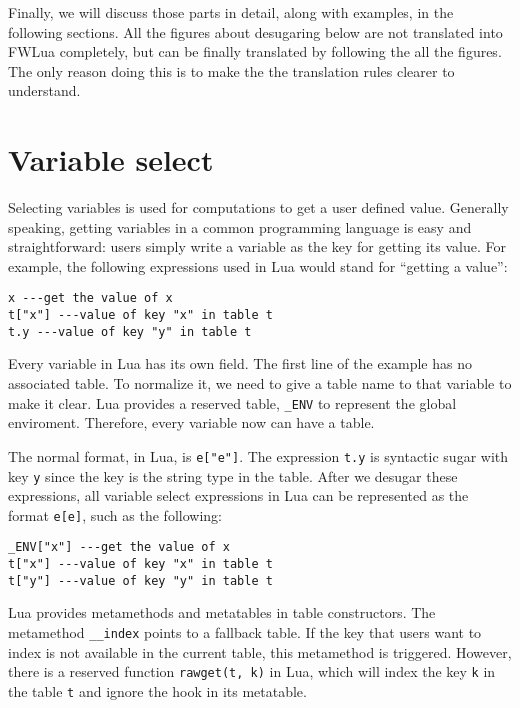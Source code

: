 Finally, we will discuss those parts in detail, along with examples, in the following sections. All the figures about desugaring below are not translated into FWLua completely, but can be finally translated by following the all the figures. The only reason doing this is to make the the translation rules clearer to understand.



\section{Variable select}
Selecting variables is used for computations to get a user defined value. Generally speaking, getting variables in a common programming language is easy and straightforward: users simply write a variable as the key for getting its value. For example, the following expressions used in Lua would stand for ``getting a value'':

\begin{verbatim}
x ---get the value of x
t["x"] ---value of key "x" in table t
t.y ---value of key "y" in table t
\end{verbatim}

Every variable in Lua has its own field. 
The first line of the example has no associated table.
To normalize it, we need to give a table name to that variable to make it clear.
Lua provides a reserved table, {\tt \_ENV} to represent the global enviroment. Therefore, every variable now can have a table.

The normal format, in Lua, is {\tt e["e"]}. 
The expression {\tt t.y} is syntactic sugar with key {\tt y} since the key is the string type in the table. After we desugar these expressions, all variable select expressions in Lua can be represented as the format {\tt e[e]}, such as the following:

\begin{verbatim}
_ENV["x"] ---get the value of x
t["x"] ---value of key "x" in table t
t["y"] ---value of key "y" in table t
\end{verbatim}

Lua provides metamethods and metatables in table constructors. The metamethod {\tt \_\_index} points to a fallback table. If the key that users want to index is not available in the current table, this metamethod is triggered. However, there is a reserved function {\tt rawget(t, k)} in Lua, which will index the key {\tt k} in the table {\tt t} and ignore the hook in its metatable.

